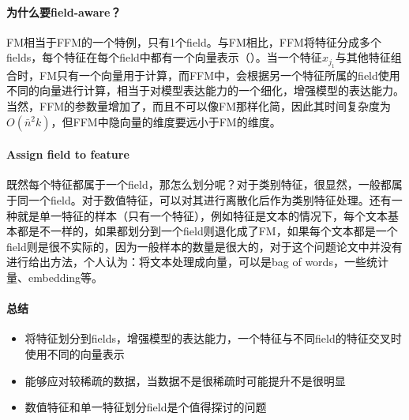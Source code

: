 \paragraph{为什么要field-aware？}
FM相当于FFM的一个特例，只有1个field。与FM相比，FFM将特征分成多个fields，每个特征在每个field中都有一个向量表示（）。当一个特征$x_{j_1}$与其他特征组合时，FM只有一个向量用于计算，而FFM中，会根据另一个特征所属的field使用不同的向量进行计算，相当于对模型表达能力的一个细化，增强模型的表达能力。当然，FFM的参数量增加了，而且不可以像FM那样化简，因此其时间复杂度为$O(\bar{n}^2k)$，但FFM中隐向量的维度要远小于FM的维度。

\paragraph{Assign field to feature}
既然每个特征都属于一个field，那怎么划分呢？对于类别特征，很显然，一般都属于同一个field。对于数值特征，可以对其进行离散化后作为类别特征处理。还有一种就是单一特征的样本（只有一个特征），例如特征是文本的情况下，每个文本基本都是不一样的，如果都划分到一个field则退化成了FM，如果每个文本都是一个field则是很不实际的，因为一般样本的数量是很大的，对于这个问题论文中并没有进行给出方法，个人认为：将文本处理成向量，可以是bag of words，一些统计量、embedding等。

\paragraph{总结}

\begin{itemize}
	\item 将特征划分到fields，增强模型的表达能力，一个特征与不同field的特征交叉时使用不同的向量表示
	\item 能够应对较稀疏的数据，当数据不是很稀疏时可能提升不是很明显
	\item 数值特征和单一特征划分field是个值得探讨的问题

\end{itemize}

